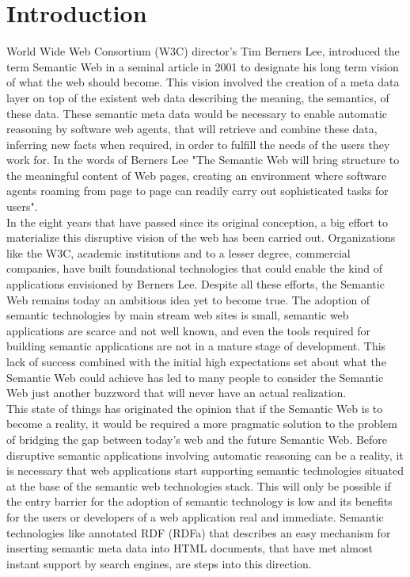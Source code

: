 \chapter{Introduction}

World Wide Web Consortium (W3C) director's Tim Berners Lee, introduced the term Semantic Web in a seminal article in 2001\cite{berners-lee_semantic_2001} to designate his long term vision of what
the web should become. This vision involved the creation of a meta data layer on top of the existent web data describing the
meaning, the semantics, of these data. These semantic meta data would be necessary to enable automatic reasoning by software
web agents, that will retrieve and combine these data, inferring new facts when required, in order to fulfill the needs of the users
they work for. In the words of Berners Lee "The Semantic Web will bring structure to the meaningful content of Web
pages, creating an environment where software agents roaming from page to page can readily carry out sophisticated tasks
for users".\\

In the eight years that have passed since its original conception, a big effort to materialize this disruptive vision of
the web has been carried out. Organizations like the W3C, academic institutions and to a lesser degree, commercial
companies, have built foundational technologies that could enable the kind of applications envisioned by Berners Lee. 
Despite all these efforts, the Semantic Web remains today an ambitious idea yet to become true. The adoption of semantic
technologies by main stream web sites is small, semantic web applications are scarce and not well known, and even the
tools required for building semantic applications are not in a mature stage of development. This lack of success
combined with the initial high expectations set about what the Semantic Web could achieve has led to many people to consider
the Semantic Web just another buzzword that will never have an actual realization.\\

This state of things has originated the opinion that if the Semantic Web is to become a reality, it would be required a more
pragmatic solution to the problem of bridging the gap between today's web and the future Semantic Web. Before disruptive
semantic applications involving automatic reasoning can be a
reality, it is necessary that web applications start supporting semantic technologies situated at the base of the
semantic web technologies stack.  This will only be possible if the
entry barrier for the adoption of semantic technology is low and its benefits for the users or developers of a web
application real and immediate. Semantic technologies like annotated RDF (RDFa) that describes an easy mechanism for
inserting semantic meta data into HTML documents, that have met almost instant support by search engines, are steps into this direction. \\

